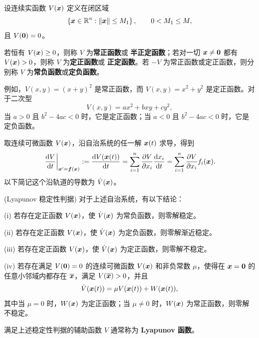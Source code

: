 \begin{definition}\label{def:正定与半正定函数}
	设连续实函数 $V(\boldsymbol{x})$ 定义在闭区域
	\[
		\left\{
		\boldsymbol{x}\in\mathbb{R}^n:\left\| \boldsymbol{x} \right\|\leq M_1
		\right\},
		\qquad 0<M_1\leq M,
	\]
	且 $V(\boldsymbol{0})=0$。

	若恒有 $V(\boldsymbol{x})\geq0$，则称 $V$ 为\textbf{常正函数}或
	\textbf{半正定函数}；若对一切 $\boldsymbol{x}\neq\boldsymbol{0}$ 都有
	$V(\boldsymbol{x})>0$，则称 $V$ 为\textbf{定正函数}或
	\textbf{正定函数}。若 $-V$ 为常正函数或定正函数，则分别称
	$V$ 为\textbf{常负函数}或\textbf{定负函数}。
\end{definition}

例如，$V(x,y)=(x+y)^2$ 是常正函数，而
$V(x,y)=x^2+y^2$ 是定正函数。对于二次型
\[
	V(x,y)=ax^2+bxy+cy^2,
\]
当 $a>0$ 且 $b^2-4ac<0$ 时，它是定正函数；当 $a<0$ 且
$b^2-4ac<0$ 时，它是定负函数。

取连续可微函数 $V(\boldsymbol{x})$，沿自治系统的任一解
$\boldsymbol{x}(t)$ 求导，得到
\[
	\left.\dfrac{\mathrm{d} V}{\mathrm{d} t}\right|_{\boldsymbol{x}'=\boldsymbol{f}(\boldsymbol{x})}
	\mathrel{:=}
	\dfrac{\mathrm{d} V(\boldsymbol{x}(t))}{\mathrm{d} t}
	=\sum_{i=1}^n
	\dfrac{\partial V}{\partial x_i}
	\dfrac{\mathrm{d} x_i}{\mathrm{d} t}
	=\sum_{i=1}^n
	\dfrac{\partial V}{\partial x_i}f_i(\boldsymbol{x}).
\]
以下简记这个沿轨道的导数为 $\dot V(\boldsymbol{x})$。

\begin{theorem}(Lyapunov 稳定性判据)\label{thm:Lyapunov稳定性判据}
	对于上述自治系统，有以下结论：

	\textnormal{(i)} 若存在定正函数 $V(\boldsymbol{x})$，使
	$\dot V(\boldsymbol{x})$ 为常负函数，则零解稳定。

	\textnormal{(ii)} 若存在定正函数 $V(\boldsymbol{x})$，使
	$\dot V(\boldsymbol{x})$ 为定负函数，则零解渐近稳定。

	\textnormal{(iii)} 若存在定正函数 $V(\boldsymbol{x})$，使
	$\dot V(\boldsymbol{x})$ 为定正函数，则零解不稳定。

	\textnormal{(iv)} 若存在满足 $V(\boldsymbol{0})=0$ 的连续可微函数
	$V(\boldsymbol{x})$ 和非负常数 $\mu$，使得在
	$\boldsymbol{x}=\boldsymbol{0}$ 的任意小邻域内都存在
	$\overline{\boldsymbol{x}}$，满足 $V(\overline{\boldsymbol{x}})>0$，并且
	\[
		\dot V(\boldsymbol{x}(t))
		=\mu V(\boldsymbol{x}(t))+W(\boldsymbol{x}(t)),
	\]
	其中当 $\mu=0$ 时，$W(\boldsymbol{x})$ 为定正函数；当
	$\mu\neq0$ 时，$W(\boldsymbol{x})$ 为常正函数，则零解不稳定。
\end{theorem}

满足上述稳定性判据的辅助函数 $V$ 通常称为
\textbf{Lyapunov 函数}。

